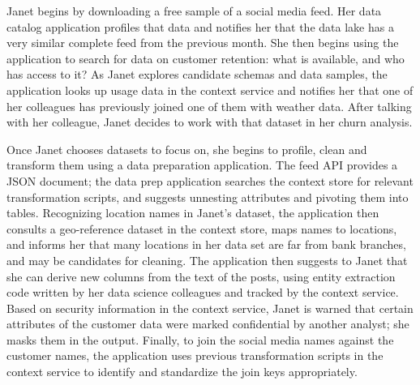 \documentclass{sig-alternate}
\begin{document}
Janet 
begins by downloading a free sample of a social media feed. Her data catalog application profiles that data and notifies her that the data lake has a very similar complete feed from the previous month. 
She then begins using the application to search for data on customer retention: what is available, and who has access to it?  As Janet explores candidate schemas and data samples, the application looks up usage data in the context service and notifies her that one of her colleagues has previously joined one of them with weather data. After talking with her colleague, Janet decides to work with that dataset in her churn analysis.  

Once Janet chooses datasets to focus on, she begins to profile, clean and transform them using a data preparation application. The feed API provides a  JSON document; the data prep application searches the context store for relevant transformation scripts, and suggests unnesting attributes and pivoting them into tables.  Recognizing location names in Janet's dataset, the application then consults a geo-reference dataset in the context store, maps names to locations, and informs her that many locations in her data set are far from bank branches, and may be candidates for cleaning. The application then suggests to Janet that she can derive new columns from the text of the posts, using entity extraction code written by her data science colleagues and tracked by the context service. Based on security information in the context service, Janet is warned that certain attributes of the customer data were marked confidential by another analyst; she masks them in the output. Finally, to join the social media names against the customer names, the application uses previous transformation scripts in the context service to identify and standardize the join keys appropriately. 
\end{document}
